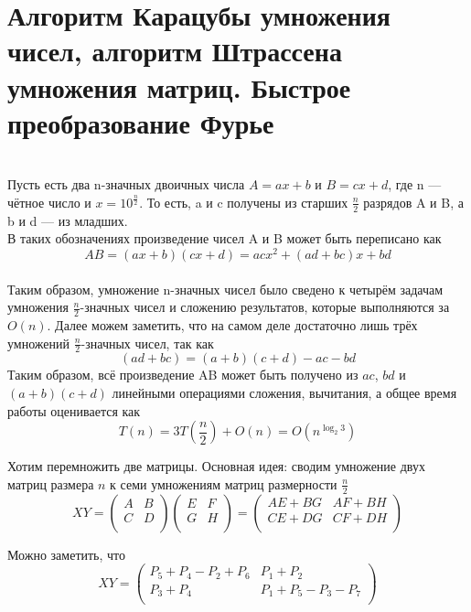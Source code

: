 \section {Алгоритм Карацубы умножения чисел, алгоритм Штрассена умножения матриц. Быстрое преобразование Фурье}

 \\
Пусть есть два n-значных двоичных числа $A = a x + b$ и $B=c x + d$, где n — чётное число и $x=10^{\frac n 2}$. То есть, a и c получены из старших $\frac n 2$ разрядов A и B, а b и d — из младших. \\

\noindent В таких обозначениях произведение чисел A и B может быть переписано как
$$
AB = (a x + b)(c x + d) = a c x^2 + (a d + b c) x + b d
$$ \\

\noindent Таким образом, умножение n-значных чисел было сведено к четырём задачам умножения $\frac n 2$-значных чисел и сложению результатов, которые выполняются за $O(n)$.
Далее можем заметить, что на самом деле достаточно лишь трёх умножений $\frac n 2$-значных чисел, так как
$$
(a d + b c) = (a + b)(c + d) - a c - b d
$$
Таким образом, всё произведение AB может быть получено из $a c$, $b d$ и $(a + b)(c + d)$ линейными операциями сложения, вычитания, а общее время работы оценивается как
$$
T(n) = 3 T (\frac {n}{2}) + O(n) =  O(n^{\log _{2}3})
$$


\noindent Хотим перемножить две матрицы. Основная идея: сводим умножение двух матриц размера $n$ к семи умножениям матриц размерности $\frac n 2$
\begin{equation*}
XY = \left(
\begin{array}{cc}
A & B \\
C & D\\
\end{array}
\right)
\left(
\begin{array}{cc}
E & F \\
G & H \\
\end{array}
\right)
=
\left(
\begin{array}{cc}
AE + BG & AF + BH \\
CE + DG & CF + DH \\
\end{array}
\right)
\end{equation*}

\noindent Можно заметить, что 
\begin{equation*}
XY = \left(
\begin{array}{cc}
P_5 + P_4 - P_2 + P_6 & P_1 + P_2 \\
P_3 + P_4 & P_1+ P_5 - P_3 - P_7\\
\end{array}
\right)
\end{equation*}

